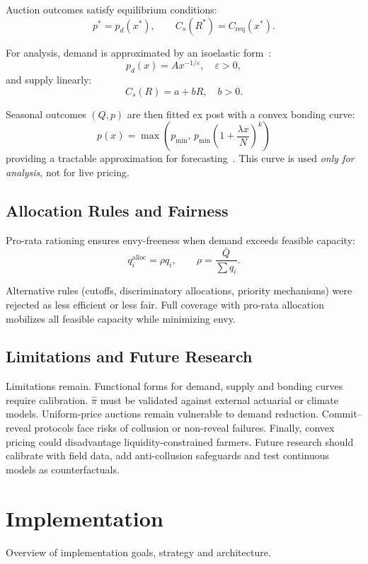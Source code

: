 \documentclass[11pt,a4paper]{article}
\begin{document}
    Auction outcomes satisfy equilibrium conditions:
    \[
    p^\ast = p_d(x^\ast), \qquad C_s(R^\ast) = C_{\mathrm{req}}(x^\ast).
    \]

    For analysis, demand is approximated by an isoelastic form~\parencite{mascolell1995microeconomic,varian1992micro}:
    \[
    p_d(x) = A x^{-1/\varepsilon}, \quad \varepsilon > 0,
    \]
    and supply linearly:
    \[
    C_s(R) = a + bR, \quad b > 0.
    \]

    Seasonal outcomes $(Q,p)$ are then fitted ex post with a convex bonding curve:
    \[
    p(x) = \max\left(p_{\min},\, p_{\min}\left(1+\frac{\lambda x}{N}\right)^k\right)
    \]
    providing a tractable approximation for forecasting~\parencite{angeris2020improved,shiller2003bond}.
    This curve is used \emph{only for analysis}, not for live pricing.

    \subsection{Allocation Rules and Fairness}\label{subsec:allocation-rules-and-fairness}

    Pro-rata rationing ensures envy-freeness when demand exceeds feasible capacity:
    \[
    q_i^{\text{alloc}} = \rho q_i, \qquad \rho = \frac{\bar{Q}}{\sum q_i}.
    \]

    Alternative rules (cutoffs, discriminatory allocations, priority mechanisms) were rejected as less efficient or less fair.
    Full coverage with pro-rata allocation mobilizes all feasible capacity while minimizing envy.

    \subsection{Limitations and Future Research}\label{subsec:limitations-and-future-research}

    Limitations remain.
    Functional forms for demand, supply and bonding curves require calibration. $\hat{\pi}$ must be validated against external actuarial or climate models.
    Uniform-price auctions remain vulnerable to demand reduction.
    Commit--reveal protocols face risks of collusion or non-reveal failures.
    Finally, convex pricing could disadvantage liquidity-constrained farmers.
    Future research should calibrate with field data, add anti-collusion safeguards and test continuous models as counterfactuals.

	
	\section{Implementation}\label{sec:implementation}
	Overview of implementation goals, strategy and architecture.
\end{document}
